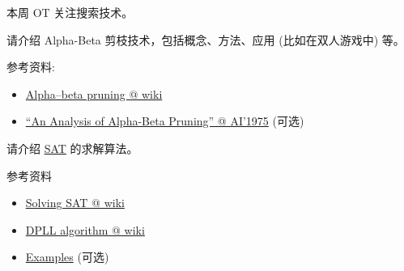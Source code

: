 \documentclass[a4paper, justified]{tufte-handout}
\begin{document}
\beginot

本周 OT 关注搜索技术。

\begin{ot}
  请介绍 Alpha-Beta 剪枝技术，包括概念、方法、应用 (比如在双人游戏中) 等。

  \noindent 参考资料:
  \begin{itemize}
    \item \href{https://en.wikipedia.org/wiki/Alpha\%E2\%80\%93beta\_pruning}{Alpha–beta pruning @ wiki}
    \item \href{https://github.com/hengxin/problem-solving-class-paperswelove/blob/master/2nd-semester/Knuth\%20(AI\%2C\%201975)\%20An\%20Analysis\%20of\%20Alpha-Beta\%20Pruning.pdf}{``An Analysis of Alpha-Beta Pruning'' @ AI'1975} (可选)
  \end{itemize}
\end{ot}

\begin{solution}
\end{solution}
\begin{ot}
  请介绍 \href{https://en.wikipedia.org/wiki/SAT\_solver}{SAT} 的求解算法。

  \noindent 参考资料
  \begin{itemize}
    \item \href{https://en.wikipedia.org/wiki/SAT\_solver#Algorithms\_for\_solving\_SAT}{Solving SAT @ wiki}
    \item \href{https://en.wikipedia.org/wiki/DPLL\_algorithm}{DPLL algorithm @ wiki}
    \item \href{https://yurichev.com/writings/SAT\_SMT\_by\_example.pdf}{Examples} (可选)
  \end{itemize}
\end{ot}




\beginfb



\end{document}

